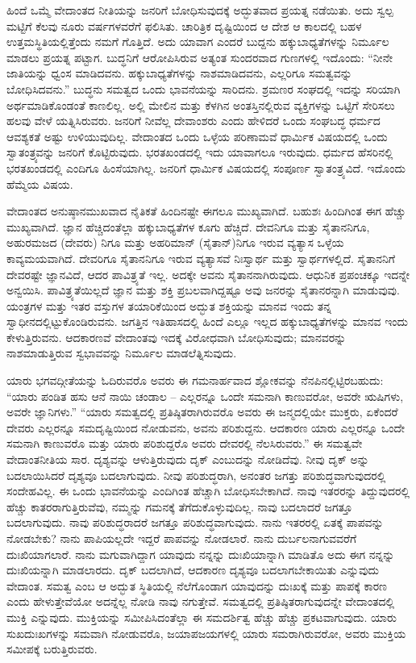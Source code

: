 ಹಿಂದೆ ಒಮ್ಮೆ ವೇದಾಂತದ ನೀತಿಯನ್ನು ಜನರಿಗೆ ಬೋಧಿಸುವುದಕ್ಕೆ ಅದ್ಭುತವಾದ ಪ್ರಯತ್ನ ನಡೆಯಿತು. ಅದು ಸ್ವಲ್ಪ ಮಟ್ಟಿಗೆ ಕೆಲವು ನೂರು ವರ್ಷಗಳವರೆಗೆ ಫಲಿಸಿತು. ಚಾರಿತ್ರಿಕ ದೃಷ್ಟಿಯಿಂದ ಆ ದೇಶ ಆ ಕಾಲದಲ್ಲಿ ಬಹಳ ಉತ್ತಮಸ್ಥಿತಿಯಲ್ಲಿತ್ತೆಂದು ನಮಗೆ ಗೊತ್ತಿದೆ. ಅದು ಯಾವಾಗ ಎಂದರೆ ಬುದ್ದನು ಹಕ್ಕುಬಾಧ್ಯತೆಗಳನ್ನು ನಿರ್ಮೂಲ ಮಾಡಲು ಪ್ರಯತ್ನ ಪಟ್ಟಾಗ. ಬುದ್ಧನಿಗೆ ಆರೋಪಿಸಿರುವ ಅತ್ಯಂತ ಸುಂದರವಾದ ಗುಣಗಳಲ್ಲಿ ಇದೊಂದು: “ನೀನೇ ಜಾತಿಯನ್ನು ಧ್ವಂಸ ಮಾಡಿದವನು. ಹಕ್ಕುಬಾಧ್ಯತೆಗಳನ್ನು ನಾಶಮಾಡಿದವನು, ಎಲ್ಲರಿಗೂ ಸಮತ್ವವನ್ನು ಬೋಧಿಸಿದವನು.” ಬುದ್ಧನು ಸಮತ್ವದ ಒಂದು ಭಾವನೆಯನ್ನು ಸಾರಿದನು. ಶ್ರಮಣರ ಸಂಘದಲ್ಲಿ ಇದನ್ನು ಸರಿಯಾಗಿ ಅರ್ಥಮಾಡಿಕೊಂಡಂತೆ ಕಾಣಲಿಲ್ಲ. ಅಲ್ಲಿ ಮೇಲಿನ ಮತ್ತು ಕೆಳಗಿನ ಅಂತಸ್ತಿನಲ್ಲಿರುವ ವ್ಯಕ್ತಿಗಳನ್ನು ಒಟ್ಟಿಗೆ ಸೇರಿಸಲು ಹಲವು ವೇಳೆ ಯತ್ನಿಸಿರುವರು. ಜನರಿಗೆ ನೀವೆಲ್ಲ ದೇವಾಂಶರು ಎಂದು ಹೇಳಿದರೆ ಒಂದು ಸಂಘಬದ್ಧ ಧರ್ಮದ ಆವಶ್ಯಕತೆ ಅಷ್ಟು ಉಳಿಯುವುದಿಲ್ಲ. ವೇದಾಂತದ ಒಂದು ಒಳ್ಳೆಯ ಪರಿಣಾಮವೆ ಧಾರ್ಮಿಕ ವಿಷಯದಲ್ಲಿ ಒಂದು ಸ್ವಾತಂತ್ರ್ಯವನ್ನು ಜನರಿಗೆ ಕೊಟ್ಟಿರುವುದು. ಭರತಖಂಡದಲ್ಲಿ ಇದು ಯಾವಾಗಲೂ ಇರುವುದು. ಧರ್ಮದ ಹೆಸರಿನಲ್ಲಿ ಭರತಖಂಡದಲ್ಲಿ ಎಂದಿಗೂ ಹಿಂಸೆಯಾಗಿಲ್ಲ. ಜನರಿಗೆ ಧಾರ್ಮಿಕ ವಿಷಯದಲ್ಲಿ ಸಂಪೂರ್ಣ ಸ್ವಾತಂತ್ರ್ಯವಿದೆ. ಇದೊಂದು ಹೆಮ್ಮೆಯ ವಿಷಯ.

ವೇದಾಂತದ ಅನುಷ್ಠಾನಮುಖವಾದ ನೈತಿಕತೆ ಹಿಂದಿನಷ್ಟೇ ಈಗಲೂ ಮುಖ್ಯವಾಗಿದೆ. ಬಹುಶಃ ಹಿಂದಿಗಿಂತ ಈಗ ಹೆಚ್ಚು ಮುಖ್ಯವಾಗಿದೆ. ಜ್ಞಾನ ಹೆಚ್ಚಿದಂತೆಲ್ಲಾ ಹಕ್ಕುಬಾಧ್ಯತೆಗಳ ಕೂಗು ಹೆಚ್ಚಿದೆ. ದೇವನಿಗೂ ಮತ್ತು ಸೈತಾನನಿಗೂ, ಅಹುರಮಜದ (ದೇವರು) ನಿಗೂ ಮತ್ತು ಅಹರಿಮಾನ್ (ಸೈತಾನ್)ನಿಗೂ ಇರುವ ವ್ಯತ್ಯಾಸ ಒಳ್ಳೆಯ ಕಾವ್ಯಮಯವಾಗಿದೆ. ದೇವರಿಗೂ ಸೈತಾನನಿಗೂ ಇರುವ ವ್ಯತ್ಯಾಸವೆ ನಿಃಸ್ವಾರ್ಥ ಮತ್ತು ಸ್ವಾರ್ಥಗಳಲ್ಲಿದೆ. ಸೈತಾನನಿಗೆ ದೇವರಷ್ಟೇ ಜ್ಞಾನವಿದೆ, ಆದರ ಪಾವಿತ್ರ್ಯತೆ ಇಲ್ಲ. ಅದಕ್ಕೇ ಅವನು ಸೈತಾನನಾಗಿರುವುದು. ಆಧುನಿಕ ಪ್ರಪಂಚಕ್ಕೂ ಇದನ್ನೇ ಅನ್ವಯಿಸಿ. ಪಾವಿತ್ರ್ಯತೆಯಿಲ್ಲದೆ ಜ್ಞಾನ ಮತ್ತು ಶಕ್ತಿ ಪ್ರಬಲವಾಗಿದ್ದಷ್ಟೂ ಅವು ಜನರನ್ನು ಸೈತಾನರನ್ನಾಗಿ ಮಾಡುವುವು. ಯಂತ್ರಗಳ ಮತ್ತು ಇತರ ವಸ್ತುಗಳ ತಯಾರಿಕೆಯಿಂದ ಅದ್ಭುತ ಶಕ್ತಿಯನ್ನು ಮಾನವ ಇಂದು ತನ್ನ ಸ್ವಾಧೀನದಲ್ಲಿಟ್ಟುಕೊಂಡಿರುವನು. ಜಗತ್ತಿನ ಇತಿಹಾಸದಲ್ಲಿ ಹಿಂದೆ ಎಲ್ಲೂ ಇಲ್ಲದ ಹಕ್ಕುಬಾಧ್ಯತೆಗಳನ್ನು ಮಾನವ ಇಂದು ಕೇಳುತ್ತಿರುವನು. ಆದಕಾರಣವೆ ವೇದಾಂತವು ಇದಕ್ಕೆ ವಿರೋಧವಾಗಿ ಬೋಧಿಸುವುದು; ಮಾನವರನ್ನು ನಾಶಮಾಡುತ್ತಿರುವ ಸ್ವಭಾವವನ್ನು ನಿರ್ಮೂಲ ಮಾಡಲೆತ್ನಿಸುವುದು.

ಯಾರು ಭಗವದ್ಗೀತೆಯನ್ನು ಓದಿರುವರೊ ಅವರು ಈ ಗಮನಾರ್ಹವಾದ ಶ್ಲೋಕವನ್ನು ನೆನಪಿನಲ್ಲಿಟ್ಟಿರಬಹುದು: “ಯಾರು ಪಂಡಿತ ಹಸು ಆನೆ ನಾಯಿ ಚಂಡಾಲ – ಎಲ್ಲರನ್ನೂ ಒಂದೇ ಸಮನಾಗಿ ಕಾಣುವರೋ, ಅವರೇ ಋಷಿಗಳು, ಅವರೇ ಜ್ಞಾನಿಗಳು.” “ಯಾರು ಸಮತ್ವದಲ್ಲಿ ಪ್ರತಿಷ್ಠಿತರಾಗಿರುವರೊ ಅವರು ಈ ಜನ್ಮದಲ್ಲಿಯೇ ಮುಕ್ತರು, ಏಕೆಂದರೆ ದೇವರು ಎಲ್ಲರನ್ನೂ ಸಮದೃಷ್ಟಿಯಿಂದ ನೋಡುವನು, ಅವನು ಪರಿಶುದ್ದನು. ಆದಕಾರಣ ಯಾರು ಎಲ್ಲರನ್ನೂ ಒಂದೇ ಸಮನಾಗಿ ಕಾಣುವರೊ ಮತ್ತು ಯಾರು ಪರಿಶುದ್ದರೊ ಅವರು ದೇವರಲ್ಲಿ ನೆಲಸಿರುವರು.” ಈ ಸಮತ್ವವೇ ವೇದಾಂತನೀತಿಯ ಸಾರ. ದೃಶ್ಯವನ್ನು ಆಳುತ್ತಿರುವುದು ದೃಕ್ ಎಂಬುದನ್ನು ನೋಡಿದೆವು. ನೀವು ದೃಕ್ ಅನ್ನು ಬದಲಾಯಿಸಿದರೆ ದೃಶ್ಯವೂ ಬದಲಾಗುವುದು. ನೀವು ಪರಿಶುದ್ಧರಾಗಿ, ಅನಂತರ ಜಗತ್ತು ಪರಿಶುದ್ಧವಾಗುವುದರಲ್ಲಿ ಸಂದೇಹವಿಲ್ಲ. ಈ ಒಂದು ಭಾವನೆಯನ್ನು ಎಂದಿಗಿಂತ ಹೆಚ್ಚಾಗಿ ಬೋಧಿಸಬೇಕಾಗಿದೆ. ನಾವು ಇತರರನ್ನು ತಿದ್ದುವುದರಲ್ಲಿ ಹೆಚ್ಚು ಕಾತರರಾಗುತ್ತಿರುವೆವು, ನಮ್ಮನ್ನು ಗಮನಕ್ಕೆ ತೆಗೆದುಕೊಳ್ಳುವುದಿಲ್ಲ. ನಾವು ಬದಲಾದರೆ ಜಗತ್ತೂ ಬದಲಾಗುವುದು. ನಾವು ಪರಿಶುದ್ಧರಾದರೆ ಜಗತ್ತೂ ಪರಿಶುದ್ಧವಾಗುವುದು. ನಾನು ಇತರರಲ್ಲಿ ಏತಕ್ಕೆ ಪಾಪವನ್ನು ನೋಡಬೇಕು? ನಾನು ಪಾಪಿಯಲ್ಲದೇ ಇದ್ದರೆ ಪಾಪವನ್ನು ನೋಡಲಾರೆ. ನಾನು ದುರ್ಬಲನಾಗುವವರೆಗೆ ದುಃಖಿಯಾಗಲಾರೆ. ನಾನು ಮಗುವಾಗಿದ್ದಾಗ ಯಾವುದು ನನ್ನನ್ನು ದುಃಖಿಯಾನ್ನಾಗಿ ಮಾಡಿತೊ ಅದು ಈಗ ನನ್ನನ್ನು ದುಃಖಿಯನ್ನಾಗಿ ಮಾಡಲಾರದು. ದೃಕ್ ಬದಲಾಗಿದೆ, ಆದಕಾರಣ ದೃಶ್ಯವೂ ಬದಲಾಗಬೇಕಾಯಿತು ಎನ್ನುವುದು ವೇದಾಂತ. ಸಮತ್ವ ಎಂಬ ಆ ಅದ್ಭುತ ಸ್ಥಿತಿಯಲ್ಲಿ ನೆಲೆಗೊಂಡಾಗ ಯಾವುದನ್ನು ದುಃಖಕ್ಕೆ ಮತ್ತು ಪಾಪಕ್ಕೆ ಕಾರಣ ಎಂದು ಹೇಳುತ್ತೇವೆಯೋ ಅದನ್ನೆಲ್ಲ ನೋಡಿ ನಾವು ನಗುತ್ತೇವೆ. ಸಮತ್ವದಲ್ಲಿ ಪ್ರತಿಷ್ಠಿತರಾಗುವುದನ್ನೇ ವೇದಾಂತದಲ್ಲಿ ಮುಕ್ತಿ ಎನ್ನುವುದು. ಮುಕ್ತಿಯನ್ನು ಸಮೀಪಿಸಿದಂತೆಲ್ಲಾ ಈ ಸಮದರ್ಶಿತ್ವ ಹೆಚ್ಚು ಹೆಚ್ಚು ಪ್ರಕಟವಾಗುವುದು. ಯಾರು ಸುಖದುಃಖಗಳನ್ನು ಸಮವಾಗಿ ನೋಡುವರೊ, ಜಯಾಪಜಯಗಳಲ್ಲಿ ಯಾರು ಸಮರಾಗಿರುವರೋ, ಅವರು ಮುಕ್ತಿಯ ಸಮೀಪಕ್ಕೆ ಬರುತ್ತಿರುವರು.

